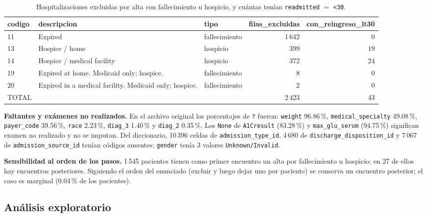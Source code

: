\documentclass[11pt,a4paper]{article}
\newcommand{\cod}[1]{\texttt{#1}}
\newenvironment{tablaentex}[2]{%
  \begin{table}[H]\centering\small\caption{#1}\label{#2}\begin{adjustbox}{max width=\textwidth}}%
  {\end{adjustbox}\end{table}}
\begin{document}
\begin{tablaentex}{Hospitalizaciones excluidas por alta con fallecimiento u hospicio, y cuántas tenían \cod{readmitted} $=$ \cod{<30}.}{tab:excl}
\begin{tabular}{lllrr}
\toprule
codigo & descripcion & tipo & filas\_excluidas & con\_reingreso\_lt30 \\
\midrule
11 & Expired & fallecimiento & 1\,642 & 0 \\
13 & Hospice / home & hospicio & 399 & 19 \\
14 & Hospice / medical facility & hospicio & 372 & 24 \\
19 & Expired at home. Medicaid only; hospice. & fallecimiento & 8 & 0 \\
20 & Expired in a medical facility. Medicaid only; hospice. & fallecimiento & 2 & 0 \\
TOTAL &  &  & 2\,423 & 43 \\
\bottomrule
\end{tabular}
\end{tablaentex}

\textbf{Faltantes y exámenes no realizados.} En el archivo original los porcentajes de \cod{?} fueron: \cod{weight} 96.86\,\%, \cod{medical\_specialty} 49.08\,\%, \cod{payer\_code} 39.56\,\%, \cod{race} 2.23\,\%, \cod{diag\_3} 1.40\,\% y \cod{diag\_2} 0.35\,\%. Los \cod{None} de \cod{A1Cresult} (83.28\,\%) y \cod{max\_glu\_serum} (94.75\,\%) significan examen no realizado y no se imputan. Del diccionario, 10\,396 celdas de \cod{admission\_type\_id}, 4\,680 de \cod{discharge\_disposition\_id} y 7\,067 de \cod{admission\_source\_id} tenían códigos ausentes; \cod{gender} tenía 3 valores \cod{Unknown/Invalid}.

\textbf{Sensibilidad al orden de los pasos.} 1\,545 pacientes tienen como primer encuentro un alta por fallecimiento u hospicio; en 27 de ellos hay encuentros posteriores. Siguiendo el orden del enunciado (excluir y luego dejar uno por paciente) se conserva un encuentro posterior; el caso es marginal (0.04\,\% de los pacientes).

\subsection{Análisis exploratorio}
\end{document}
